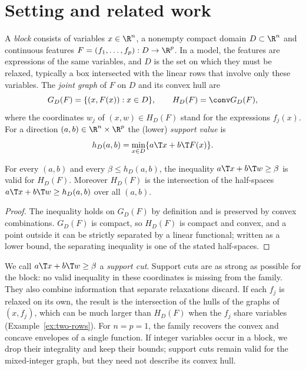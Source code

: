\section{Setting and related work}\label{sec:setting}

A \emph{block} consists of variables $x\in\R^n$, a nonempty compact domain
$D\subset\R^n$ and continuous features $F=(f_1,\dots,f_p):D\to\R^p$. In a
model, the features are expressions of the same variables, and $D$ is the
set on which they must be relaxed, typically a box intersected with the
linear rows that involve only these variables. The \emph{joint graph} of $F$
on $D$ and its convex hull are
\begin{equation}\label{eq:joint-hull}
G_D(F)=\{(x,F(x)):x\in D\},\qquad H_D(F)=\conv G_D(F),
\end{equation}
where the coordinates $w_j$ of $(x,w)\in H_D(F)$ stand for the expressions
$f_j(x)$. For a direction $(a,b)\in\R^n\times\R^p$ the (lower) \emph{support
value} is
\begin{equation}\label{eq:support}
h_D(a,b)=\min_{x\in D}\{a\T x+b\T F(x)\}.
\end{equation}

\begin{proposition}\label{prop:support}
For every $(a,b)$ and every $\beta\le h_D(a,b)$, the inequality
$a\T x+b\T w\ge\beta$ is valid for $H_D(F)$. Moreover $H_D(F)$ is the
intersection of the half-spaces $a\T x+b\T w\ge h_D(a,b)$ over all $(a,b)$.
\end{proposition}

\begin{proof}
The inequality holds on $G_D(F)$ by definition and is preserved by convex
combinations. $G_D(F)$ is compact, so $H_D(F)$ is compact and convex, and a
point outside it can be strictly separated by a linear functional; written
as a lower bound, the separating inequality is one of the stated
half-spaces.
\end{proof}

We call $a\T x+b\T w\ge\beta$ a \emph{support cut}. Support cuts are as strong
as possible for the block: no valid inequality in these coordinates is
missing from the family. They also combine information that separate
relaxations discard. If each $f_j$ is relaxed on its own, the result is the
intersection of the hulls of the graphs of $(x,f_j)$, which can be much larger
than $H_D(F)$ when the $f_j$ share variables (Example~\ref{ex:two-rows}). For
$n=p=1$, the family recovers the convex and concave envelopes of a single
function. If integer variables occur in a block, we drop their integrality
and keep their bounds; support cuts remain valid for the mixed-integer graph,
but they need not describe its convex hull.

